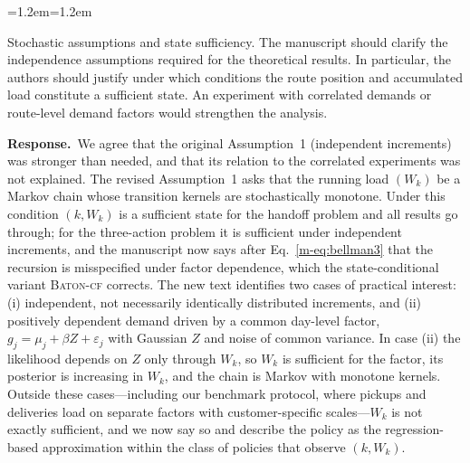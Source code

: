 \documentclass[11pt]{article}
\newenvironment{comment}{\par\medskip\noindent\color{rev}\itshape
  \begin{list}{}{\leftmargin=1.2em\rightmargin=1.2em}\item[]}%
  {\end{list}\par}
\newcommand{\resp}{\par\noindent\textbf{Response.}\ }
\begin{document}
\begin{comment}
Stochastic assumptions and state sufficiency. The manuscript should
clarify the independence assumptions required for the theoretical
results. In particular, the authors should justify under which
conditions the route position and accumulated load constitute a
sufficient state. An experiment with correlated demands or route-level
demand factors would strengthen the analysis.
\end{comment}
\resp We agree that the original Assumption~1 (independent increments)
was stronger than needed, and that its relation to the correlated
experiments was not explained. The revised Assumption~1 asks that the
running load $(W_k)$ be a Markov chain whose transition kernels are
stochastically monotone. Under this condition $(k, W_k)$ is a sufficient
state for the handoff problem and all results go through; for the
three-action problem it is sufficient under independent increments, and
the manuscript now says after Eq.~\eqref{m-eq:bellman3} that the
recursion is misspecified under factor dependence, which the
state-conditional variant \textsc{Baton-cf} corrects. The new text identifies two cases of
practical interest: (i) independent, not necessarily identically
distributed increments, and (ii) positively dependent demand driven by
a common day-level factor, $g_j = \mu_j + \beta Z + \varepsilon_j$ with
Gaussian $Z$ and noise of common variance. In case (ii) the likelihood
depends on $Z$ only through $W_k$, so $W_k$ is sufficient for the
factor, its posterior is increasing in $W_k$, and the chain is Markov
with monotone kernels. Outside these cases---including our benchmark
protocol, where pickups and deliveries load on separate factors with
customer-specific scales---$W_k$ is not exactly sufficient, and we now
say so and describe the policy as the regression-based approximation
within the class of policies that observe $(k,W_k)$.
\end{document}
